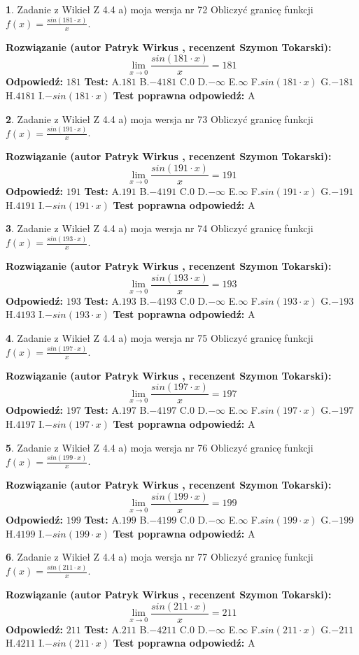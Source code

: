 \documentclass[12pt, a4paper]{article}
\theoremstyle{definition} %
\newtheorem{zad}{}
\newcommand{\zadStart}[1]{\begin{zad}#1\newline}
\newcommand{\zadStop}{\end{zad}}
\newcommand{\rozwStart}[2]{\noindent \textbf{Rozwiązanie (autor #1 , recenzent #2): }\newline}
\newcommand{\rozwStop}{\newline}
\newcommand{\odpStart}{\noindent \textbf{Odpowiedź:}\newline}
\newcommand{\odpStop}{\newline}
\newcommand{\testStart}{\noindent \textbf{Test:}\newline}
\newcommand{\testStop}{\newline}
\newcommand{\kluczStart}{\noindent \textbf{Test poprawna odpowiedź:}\newline}
\newcommand{\kluczStop}{\newline}
\begin{document}
\zadStart{Zadanie z Wikieł Z 4.4 a) moja wersja nr 72}
Obliczyć granicę funkcji $f(x)=\frac{sin(181\cdot x)}{x}$.
\zadStop
\rozwStart{Patryk Wirkus}{Szymon Tokarski}
$$\lim\limits_{x\to 0}\frac{sin(181\cdot x)}{x}=
181$$
\rozwStop
\odpStart
$181$
\odpStop
\testStart
A.$181$
B.$-4181$
C.$0$
D.$-\infty$
E.$\infty$
F.$sin(181\cdot x)$
G.$-181$
H.$4181$
I.$-sin(181\cdot x)$
\testStop
\kluczStart
A
\kluczStop



\zadStart{Zadanie z Wikieł Z 4.4 a) moja wersja nr 73}
Obliczyć granicę funkcji $f(x)=\frac{sin(191\cdot x)}{x}$.
\zadStop
\rozwStart{Patryk Wirkus}{Szymon Tokarski}
$$\lim\limits_{x\to 0}\frac{sin(191\cdot x)}{x}=
191$$
\rozwStop
\odpStart
$191$
\odpStop
\testStart
A.$191$
B.$-4191$
C.$0$
D.$-\infty$
E.$\infty$
F.$sin(191\cdot x)$
G.$-191$
H.$4191$
I.$-sin(191\cdot x)$
\testStop
\kluczStart
A
\kluczStop



\zadStart{Zadanie z Wikieł Z 4.4 a) moja wersja nr 74}
Obliczyć granicę funkcji $f(x)=\frac{sin(193\cdot x)}{x}$.
\zadStop
\rozwStart{Patryk Wirkus}{Szymon Tokarski}
$$\lim\limits_{x\to 0}\frac{sin(193\cdot x)}{x}=
193$$
\rozwStop
\odpStart
$193$
\odpStop
\testStart
A.$193$
B.$-4193$
C.$0$
D.$-\infty$
E.$\infty$
F.$sin(193\cdot x)$
G.$-193$
H.$4193$
I.$-sin(193\cdot x)$
\testStop
\kluczStart
A
\kluczStop



\zadStart{Zadanie z Wikieł Z 4.4 a) moja wersja nr 75}
Obliczyć granicę funkcji $f(x)=\frac{sin(197\cdot x)}{x}$.
\zadStop
\rozwStart{Patryk Wirkus}{Szymon Tokarski}
$$\lim\limits_{x\to 0}\frac{sin(197\cdot x)}{x}=
197$$
\rozwStop
\odpStart
$197$
\odpStop
\testStart
A.$197$
B.$-4197$
C.$0$
D.$-\infty$
E.$\infty$
F.$sin(197\cdot x)$
G.$-197$
H.$4197$
I.$-sin(197\cdot x)$
\testStop
\kluczStart
A
\kluczStop



\zadStart{Zadanie z Wikieł Z 4.4 a) moja wersja nr 76}
Obliczyć granicę funkcji $f(x)=\frac{sin(199\cdot x)}{x}$.
\zadStop
\rozwStart{Patryk Wirkus}{Szymon Tokarski}
$$\lim\limits_{x\to 0}\frac{sin(199\cdot x)}{x}=
199$$
\rozwStop
\odpStart
$199$
\odpStop
\testStart
A.$199$
B.$-4199$
C.$0$
D.$-\infty$
E.$\infty$
F.$sin(199\cdot x)$
G.$-199$
H.$4199$
I.$-sin(199\cdot x)$
\testStop
\kluczStart
A
\kluczStop



\zadStart{Zadanie z Wikieł Z 4.4 a) moja wersja nr 77}
Obliczyć granicę funkcji $f(x)=\frac{sin(211\cdot x)}{x}$.
\zadStop
\rozwStart{Patryk Wirkus}{Szymon Tokarski}
$$\lim\limits_{x\to 0}\frac{sin(211\cdot x)}{x}=
211$$
\rozwStop
\odpStart
$211$
\odpStop
\testStart
A.$211$
B.$-4211$
C.$0$
D.$-\infty$
E.$\infty$
F.$sin(211\cdot x)$
G.$-211$
H.$4211$
I.$-sin(211\cdot x)$
\testStop
\kluczStart
A
\kluczStop
\end{document}
